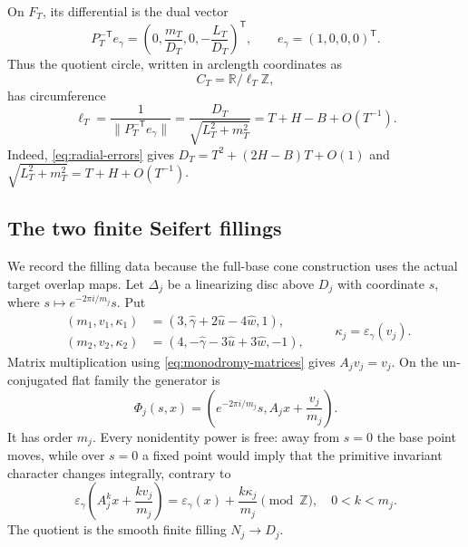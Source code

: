 \documentclass[11pt,letterpaper]{article}
\numberwithin{equation}{section}
\theoremstyle{definition}
\theoremstyle{remark}
\newcommand{\R}{\mathbb R}
\newcommand{\Z}{\mathbb Z}
\begin{document}
On $F_T$, its differential is the dual vector
\begin{equation}
 P_T^{-\mathsf T}e_\gamma
 =\left(0,\frac{m_T}{D_T},0,-\frac{L_T}{D_T}\right)^{\mathsf T},
 \qquad e_\gamma=(1,0,0,0)^{\mathsf T}.
 \label{eq:circle-dual}
\end{equation}
Thus the quotient circle, written in arclength coordinates as
\begin{equation}
 C_T=\R/\ell_T\Z,
 \label{eq:CT}
\end{equation}
has circumference
\begin{equation}
 \ell_T=\frac{1}{\|P_T^{-\mathsf T}e_\gamma\|}
 =\frac{D_T}{\sqrt{L_T^2+m_T^2}}
 =T+H-B+O(T^{-1}).
 \label{eq:circle-length}
\end{equation}
Indeed, \cref{eq:radial-errors} gives
$D_T=T^2+(2H-B)T+O(1)$ and
$\sqrt{L_T^2+m_T^2}=T+H+O(T^{-1})$.

\subsection{The two finite Seifert fillings}

We record the filling data because the full-base cone construction uses the
actual target overlap maps.  Let $\Delta_j$ be a linearizing disc above
$D_j$ with coordinate $s$, where
$s\mapsto e^{-2\pi i/m_j}s$.  Put
\begin{equation}
 \begin{aligned}
 (m_1,v_1,\kappa_1)
  &=(3,\widehat\gamma+2\widehat u-4\widehat w,1),\\
 (m_2,v_2,\kappa_2)
  &=(4,-\widehat\gamma-3\widehat u+3\widehat w,-1),
 \end{aligned}
 \qquad \kappa_j=\varepsilon_\gamma(v_j).
 \label{eq:finite-data}
\end{equation}
Matrix multiplication using \cref{eq:monodromy-matrices} gives
$A_jv_j=v_j$.  On the un-conjugated flat family the generator is
\begin{equation}
 \Phi_j(s,x)=
 \left(e^{-2\pi i/m_j}s,A_jx+\frac{v_j}{m_j}\right).
 \label{eq:finite-affine-action}
\end{equation}
It has order $m_j$.  Every nonidentity power is free: away from $s=0$
the base point moves, while over $s=0$ a fixed point would imply that the
primitive invariant character changes integrally, contrary to
\begin{equation}
 \varepsilon_\gamma
 \left(A_j^kx+\frac{k v_j}{m_j}\right)
 =\varepsilon_\gamma(x)+\frac{k\kappa_j}{m_j}\pmod{\Z},
 \quad 0<k<m_j.
 \label{eq:finite-character-shift}
\end{equation}
The quotient is the smooth finite filling $N_j\to D_j$.
\end{document}
